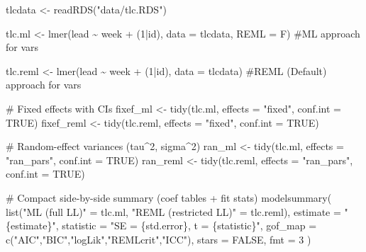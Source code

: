 \documentclass[
  letterpaper,
  DIV=11,
  numbers=noendperiod]{scrreprt}
\newenvironment{Shaded}{\begin{snugshade}}{\end{snugshade}}
\newcommand{\AttributeTok}[1]{\textcolor[rgb]{0.40,0.45,0.13}{#1}}
\newcommand{\CommentTok}[1]{\textcolor[rgb]{0.37,0.37,0.37}{#1}}
\newcommand{\ConstantTok}[1]{\textcolor[rgb]{0.56,0.35,0.01}{#1}}
\newcommand{\DecValTok}[1]{\textcolor[rgb]{0.68,0.00,0.00}{#1}}
\newcommand{\FunctionTok}[1]{\textcolor[rgb]{0.28,0.35,0.67}{#1}}
\newcommand{\NormalTok}[1]{\textcolor[rgb]{0.00,0.23,0.31}{#1}}
\newcommand{\OtherTok}[1]{\textcolor[rgb]{0.00,0.23,0.31}{#1}}
\newcommand{\SpecialCharTok}[1]{\textcolor[rgb]{0.37,0.37,0.37}{#1}}
\newcommand{\StringTok}[1]{\textcolor[rgb]{0.13,0.47,0.30}{#1}}
\begin{document}
\begin{Shaded}
\begin{Highlighting}[]
\NormalTok{tlcdata }\OtherTok{\textless{}{-}} \FunctionTok{readRDS}\NormalTok{(}\StringTok{"data/tlc.RDS"}\NormalTok{)}

\NormalTok{tlc.ml }\OtherTok{\textless{}{-}} \FunctionTok{lmer}\NormalTok{(lead }\SpecialCharTok{\textasciitilde{}}\NormalTok{ week }\SpecialCharTok{+}\NormalTok{ (}\DecValTok{1}\SpecialCharTok{|}\NormalTok{id), }\AttributeTok{data =}\NormalTok{ tlcdata, }\AttributeTok{REML =}\NormalTok{ F) }\CommentTok{\#ML approach for vars}

\NormalTok{tlc.reml }\OtherTok{\textless{}{-}} \FunctionTok{lmer}\NormalTok{(lead }\SpecialCharTok{\textasciitilde{}}\NormalTok{ week }\SpecialCharTok{+}\NormalTok{ (}\DecValTok{1}\SpecialCharTok{|}\NormalTok{id),  }\AttributeTok{data =}\NormalTok{ tlcdata) }\CommentTok{\#REML (Default) approach for vars}


\CommentTok{\# Fixed effects with CIs}
\NormalTok{fixef\_ml   }\OtherTok{\textless{}{-}} \FunctionTok{tidy}\NormalTok{(tlc.ml,   }\AttributeTok{effects =} \StringTok{"fixed"}\NormalTok{, }\AttributeTok{conf.int =} \ConstantTok{TRUE}\NormalTok{)}
\NormalTok{fixef\_reml }\OtherTok{\textless{}{-}} \FunctionTok{tidy}\NormalTok{(tlc.reml, }\AttributeTok{effects =} \StringTok{"fixed"}\NormalTok{, }\AttributeTok{conf.int =} \ConstantTok{TRUE}\NormalTok{)}

\CommentTok{\# Random{-}effect variances (tau\^{}2, sigma\^{}2)}
\NormalTok{ran\_ml   }\OtherTok{\textless{}{-}} \FunctionTok{tidy}\NormalTok{(tlc.ml,   }\AttributeTok{effects =} \StringTok{"ran\_pars"}\NormalTok{, }\AttributeTok{conf.int =} \ConstantTok{TRUE}\NormalTok{)}
\NormalTok{ran\_reml }\OtherTok{\textless{}{-}} \FunctionTok{tidy}\NormalTok{(tlc.reml, }\AttributeTok{effects =} \StringTok{"ran\_pars"}\NormalTok{, }\AttributeTok{conf.int =} \ConstantTok{TRUE}\NormalTok{)}

\CommentTok{\# Compact side{-}by{-}side summary (coef tables + fit stats)}
\FunctionTok{modelsummary}\NormalTok{(}
  \FunctionTok{list}\NormalTok{(}\StringTok{"ML (full LL)"} \OtherTok{=}\NormalTok{ tlc.ml, }\StringTok{"REML (restricted LL)"} \OtherTok{=}\NormalTok{ tlc.reml),}
  \AttributeTok{estimate  =} \StringTok{"\{estimate\}"}\NormalTok{,}
  \AttributeTok{statistic =} \StringTok{"SE = \{std.error\}, t = \{statistic\}"}\NormalTok{,}
  \AttributeTok{gof\_map =} \FunctionTok{c}\NormalTok{(}\StringTok{"AIC"}\NormalTok{,}\StringTok{"BIC"}\NormalTok{,}\StringTok{"logLik"}\NormalTok{,}\StringTok{"REMLcrit"}\NormalTok{,}\StringTok{"ICC"}\NormalTok{),}
  \AttributeTok{stars =} \ConstantTok{FALSE}\NormalTok{, }\AttributeTok{fmt =} \DecValTok{3}
\NormalTok{)}
\end{Highlighting}
\end{Shaded}
\end{document}
